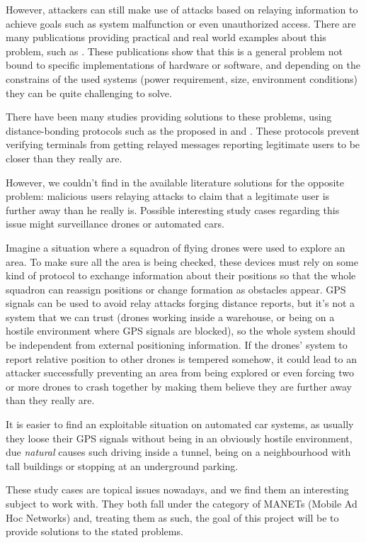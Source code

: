 \documentclass{article}
\begin{document}
However, attackers can still make use of attacks based on relaying information to achieve goals such as system malfunction or even unauthorized access. There are many publications providing practical and real world examples about this problem, such as \cite{francillon2011relay, hancke2005practical, hu2006wormhole}. These publications show that this is a general problem not bound to specific implementations of hardware or software, and depending on the constrains of the used systems (power requirement, size, environment conditions) they can be quite challenging to solve.

There have been many studies providing solutions to these problems, using distance-bonding protocols such as the proposed in \cite{brands1994distance} and \cite{rasmussen2010realization}. These protocols prevent verifying terminals from getting relayed messages reporting legitimate users to be closer than they really are.

However, we couldn't find in the available literature solutions for the opposite problem: malicious users relaying attacks to claim that a legitimate user is further away than he really is. Possible interesting study cases regarding this issue might surveillance drones or automated cars.

Imagine a situation where a squadron of flying drones were used to explore an area. To make sure all the area is being checked, these devices must rely on some kind of protocol to exchange information about their positions so that the whole squadron can reassign positions or change formation as obstacles appear. GPS signals can be used to avoid relay attacks forging distance reports, but it's not a system that we can trust (drones working inside a warehouse, or being on a hostile environment where GPS signals are blocked), so the whole system should be independent from external positioning information. If the drones' system to report relative position to other drones is tempered somehow, it could lead to an attacker successfully preventing an area from being explored or even forcing two or more drones to crash together by making them believe they are further away than they really are.

It is easier to find an exploitable situation on automated car systems, as usually they loose their GPS signals without being in an obviously hostile environment, due \emph{natural} causes such driving inside a tunnel, being on a neighbourhood with tall buildings or stopping at an underground parking.

These study cases are topical issues nowadays, and we find them an interesting subject to work with. They both fall under the category of MANETs (Mobile Ad Hoc Networks) and, treating them as such, the goal of this project will be to provide solutions to the stated problems.
\end{document}
